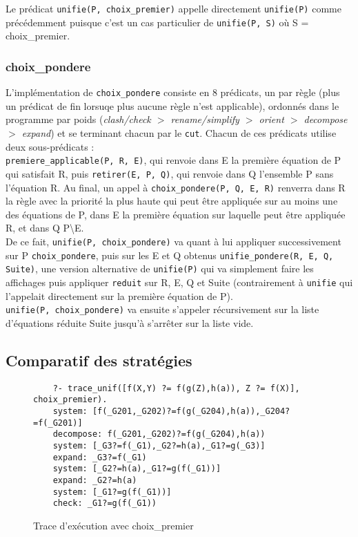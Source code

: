 \documentclass[12pt]{article} %
\begin{document}
Le prédicat \verb|unifie(P, choix_premier)| appelle directement \verb|unifie(P)| comme précé\-demment puisque c'est un cas particulier de \verb|unifie(P, S)| où S = choix\_premier.

\subsubsection*{choix\_pondere}

L'implémentation de \verb|choix_pondere| consiste en 8 prédicats, un par règle (plus un prédicat de fin lorsuqe plus aucune règle n'est applicable), ordonnés dans le programme par poids (\textit{clash/check $>$ rename/simplify $>$ orient $>$ decompose $>$ expand}) et se terminant chacun par le \verb|cut|. Chacun de ces prédicats utilise deux sous-prédicats :\\\verb|premiere_applicable(P, R, E)|, qui renvoie dans E la première équation de P qui satisfait R, puis \verb|retirer(E, P, Q)|, qui renvoie dans Q l'ensemble P sans l'équation R. Au final, un appel à \verb|choix_pondere(P, Q, E, R)| renverra dans R la règle avec la priorité la plus haute qui peut être appliquée sur au moins une des équations de P, dans E la première équation sur laquelle peut être appliquée R, et dans Q P\textbackslash{E}.\\

De ce fait, \verb|unifie(P, choix_pondere)| va quant à lui appliquer successivement sur P \verb|choix_pondere|, puis sur les E et Q obtenus \verb|unifie_pondere(R, E, Q, Suite)|, une version alternative de \verb|unifie(P)| qui va simplement faire les affichages puis appliquer \verb|reduit| sur R, E, Q et Suite (contrairement à \verb|unifie| qui l'appelait directement sur la première équation de P).\\

\verb|unifie(P, choix_pondere)| va ensuite s'appeler récursivement sur la liste d'équations réduite Suite jusqu'à s'arrêter sur la liste vide. 

\subsection*{Comparatif des stratégies}

\begin{figure}[h!]
	\begin{verbatim}
	?- trace_unif([f(X,Y) ?= f(g(Z),h(a)), Z ?= f(X)], choix_premier).
	system: [f(_G201,_G202)?=f(g(_G204),h(a)),_G204?=f(_G201)]
	decompose: f(_G201,_G202)?=f(g(_G204),h(a))
	system: [_G3?=f(_G1),_G2?=h(a),_G1?=g(_G3)]
	expand: _G3?=f(_G1)
	system: [_G2?=h(a),_G1?=g(f(_G1))]
	expand: _G2?=h(a)
	system: [_G1?=g(f(_G1))]
	check: _G1?=g(f(_G1))
	\end{verbatim}
	\caption{Trace d'exécution avec choix\_premier}
\end{figure}
\end{document}
